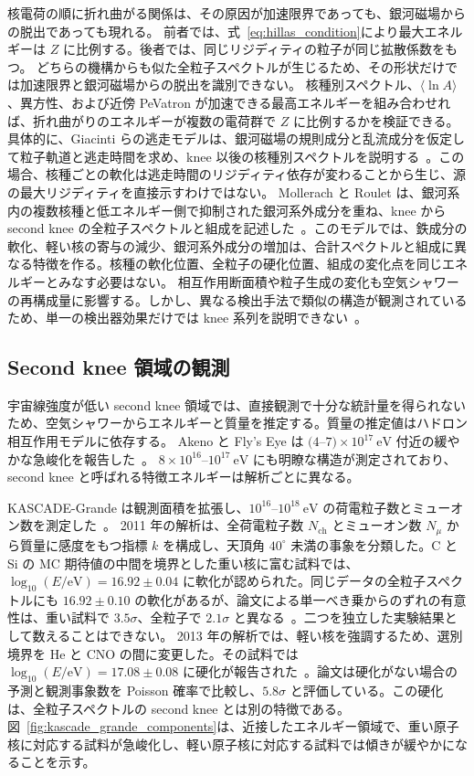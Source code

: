 \documentclass[book,paper=a4,fontsize=11pt]{jlreq}
\begin{document}
核電荷の順に折れ曲がる関係は、その原因が加速限界であっても、銀河磁場からの脱出であっても現れる。
前者では、式~\eqref{eq:hillas_condition}により最大エネルギーは \(Z\) に比例する。後者では、同じリジディティの粒子が同じ拡散係数をもつ。
どちらの機構からも似た全粒子スペクトルが生じるため、その形状だけでは加速限界と銀河磁場からの脱出を識別できない。
核種別スペクトル、\(\langle\ln A\rangle\)、異方性、および近傍 PeVatron が加速できる最高エネルギーを組み合わせれば、折れ曲がりのエネルギーが複数の電荷群で \(Z\) に比例するかを検証できる。
具体的に、Giacinti らの逃走モデルは、銀河磁場の規則成分と乱流成分を仮定して粒子軌道と逃走時間を求め、knee 以後の核種別スペクトルを説明する~\cite{Giacinti2015Escape}。この場合、核種ごとの軟化は逃走時間のリジディティ依存が変わることから生じ、源の最大リジディティを直接示すわけではない。
Mollerach と Roulet は、銀河系内の複数核種と低エネルギー側で抑制された銀河系外成分を重ね、knee から second knee の全粒子スペクトルと組成を記述した~\cite{Mollerach2019Knee}。このモデルでは、鉄成分の軟化、軽い核の寄与の減少、銀河系外成分の増加は、合計スペクトルと組成に異なる特徴を作る。核種の軟化位置、全粒子の硬化位置、組成の変化点を同じエネルギーとみなす必要はない。
相互作用断面積や粒子生成の変化も空気シャワーの再構成量に影響する。しかし、異なる検出手法で類似の構造が観測されているため、単一の検出器効果だけでは knee 系列を説明できない~\cite{PDGCosmicRays}。
\FloatBarrier

\subsection{Second knee 領域の観測}\label{subsec:second_knee_observations}
宇宙線強度が低い second knee 領域では、直接観測で十分な統計量を得られないため、空気シャワーからエネルギーと質量を推定する。質量の推定値はハドロン相互作用モデルに依存する。
Akeno と Fly's Eye は \((4\)--\(7)\times10^{17}\ \mathrm{eV}\) 付近の緩やかな急峻化を報告した~\cite{AkenoSpectrum1992,FlysEyeSpectrum1994,Horandel2003}。
\(8\times10^{16}\)--\(10^{17}\ \mathrm{eV}\) にも明瞭な構造が測定されており、second knee と呼ばれる特徴エネルギーは解析ごとに異なる。

KASCADE-Grande は観測面積を拡張し、\(10^{16}\)--\(10^{18}\ \mathrm{eV}\) の荷電粒子数とミューオン数を測定した~\cite{KASCADEGrandeDetector2010}。
2011 年の解析は、全荷電粒子数 \(N_{\mathrm{ch}}\) とミューオン数 \(N_\mu\) から質量に感度をもつ指標 \(k\) を構成し、天頂角 \(40^\circ\) 未満の事象を分類した。C と Si の MC 期待値の中間を境界とした重い核に富む試料では、\(\log_{10}(E/\mathrm{eV})=16.92\pm0.04\) に軟化が認められた。同じデータの全粒子スペクトルにも \(16.92\pm0.10\) の軟化があるが、論文による単一べき乗からのずれの有意性は、重い試料で \(3.5\sigma\)、全粒子で \(2.1\sigma\) と異なる~\cite{KASCADEGrandeHeavyKnee2011}。二つを独立した実験結果として数えることはできない。
2013 年の解析では、軽い核を強調するため、選別境界を He と CNO の間に変更した。その試料では \(\log_{10}(E/\mathrm{eV})=17.08\pm0.08\) に硬化が報告された~\cite{KASCADEGrandeLightAnkle2013}。論文は硬化がない場合の予測と観測事象数を Poisson 確率で比較し、\(5.8\sigma\) と評価している。この硬化は、全粒子スペクトルの second knee とは別の特徴である。
図~\ref{fig:kascade_grande_components}は、近接したエネルギー領域で、重い原子核に対応する試料が急峻化し、軽い原子核に対応する試料では傾きが緩やかになることを示す。
\end{document}
